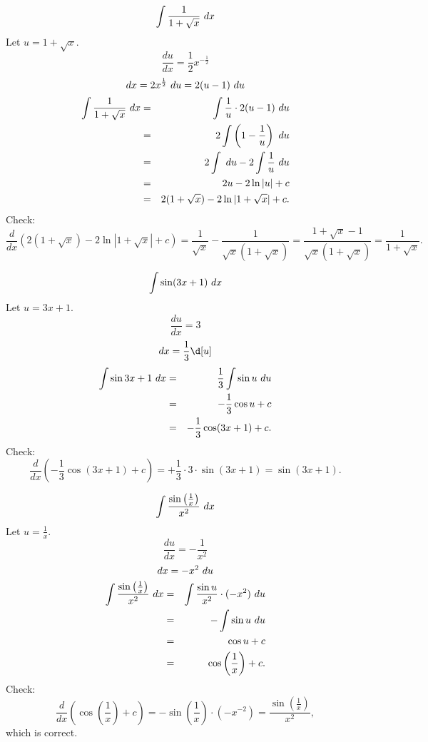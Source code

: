 \begin{example}
\[\int\frac{1}{1+\sqrt{x}}\dx\]
Let $u=1+\sqrt{x}$.
\[\frac{du}{dx}=\frac{1}{2}x^{-\frac{1}{2}}\]
\[dx=2x^{\frac{1}{2}}\dx[u]=2(u-1)\dx[u]\]
\begin{eqnarray*}
\int \frac{1}{1+\sqrt{x}}\dx &=& \int \frac{1}{u}\cdot2(u-1)\dx[u] \\
&=& 2\int\left(1-\frac{1}{u}\right)\dx[u] \\
&=& 2\int\dx[u]-2\int\frac{1}{u}\dx[u] \\
&=& 2u-2\ln|u| +c\\
&=& 2(1+\sqrt{x})-2\ln |1+\sqrt{x}| +c.
\end{eqnarray*}
Check:
\[\frac{d}{dx}\left( 2(1+\sqrt{x})-2\ln |1+\sqrt{x}| +c\right) = \frac{1}{\sqrt{x}}-\frac{1}{\sqrt{x}(1+\sqrt{x})} =\frac{1+\sqrt{x}-1}{\sqrt{x}(1+\sqrt{x})}=\frac{1}{1+\sqrt{x}}.\]
\end{example}

\begin{example}
\[\int\sin(3x+1)\dx\]
Let $u=3x+1$.
\[\frac{du}{dx}=3\]
\[dx=\frac{1}{3}\d[u]\]
\begin{eqnarray*}
\int\sin{3x+1}\dx &=& \frac{1}{3}\int\sin u\dx[u] \\
&=& -\frac{1}{3}\cos u + c \\
&=& -\frac{1}{3}\cos(3x+1) + c.
\end{eqnarray*}
Check:
\[\frac{d}{dx}\left(-\frac{1}{3}\cos(3x+1)+c\right)=+\frac{1}{3}\cdot3\cdot\sin(3x+1)=\sin(3x+1).\]
\end{example}

\begin{example}
\[\int\frac{\sin\left(\frac{1}{x}\right)}{x^2}\dx\]
Let $u=\frac{1}{x}$.
\[\frac{du}{dx}=-\frac{1}{x^2}\]
\[dx=-x^2\dx[u]\]
\begin{eqnarray*}
\int\frac{\sin\left(\frac{1}{x}\right)}{x^2}\dx &=& \int \frac{\sin u}{x^2}\cdot(-x^2)\dx[u] \\
&=& -\int\sin u \dx[u] \\
&=& \cos u + c \\
&=& \cos\left(\frac{1}{x}\right) + c.
\end{eqnarray*}
Check:
\[\frac{d}{dx}\left(\cos\left(\frac{1}{x}\right) + c\right)=-\sin\left(\frac{1}{x}\right)\cdot\left(-x^{-2}\right)=\frac{\sin\left(\frac{1}{x}\right)}{x^2},\]
which is correct.
\end{example}
